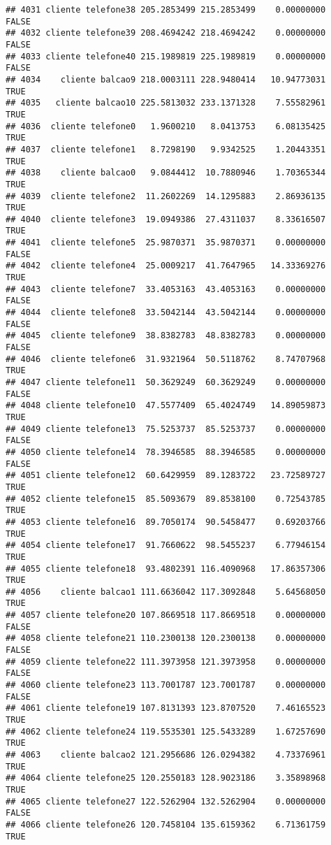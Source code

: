 \documentclass[
]{article}
\begin{document}
\begin{verbatim}
## 4031 cliente telefone38 205.2853499 215.2853499    0.00000000    FALSE
## 4032 cliente telefone39 208.4694242 218.4694242    0.00000000    FALSE
## 4033 cliente telefone40 215.1989819 225.1989819    0.00000000    FALSE
## 4034    cliente balcao9 218.0003111 228.9480414   10.94773031     TRUE
## 4035   cliente balcao10 225.5813032 233.1371328    7.55582961     TRUE
## 4036  cliente telefone0   1.9600210   8.0413753    6.08135425     TRUE
## 4037  cliente telefone1   8.7298190   9.9342525    1.20443351     TRUE
## 4038    cliente balcao0   9.0844412  10.7880946    1.70365344     TRUE
## 4039  cliente telefone2  11.2602269  14.1295883    2.86936135     TRUE
## 4040  cliente telefone3  19.0949386  27.4311037    8.33616507     TRUE
## 4041  cliente telefone5  25.9870371  35.9870371    0.00000000    FALSE
## 4042  cliente telefone4  25.0009217  41.7647965   14.33369276     TRUE
## 4043  cliente telefone7  33.4053163  43.4053163    0.00000000    FALSE
## 4044  cliente telefone8  33.5042144  43.5042144    0.00000000    FALSE
## 4045  cliente telefone9  38.8382783  48.8382783    0.00000000    FALSE
## 4046  cliente telefone6  31.9321964  50.5118762    8.74707968     TRUE
## 4047 cliente telefone11  50.3629249  60.3629249    0.00000000    FALSE
## 4048 cliente telefone10  47.5577409  65.4024749   14.89059873     TRUE
## 4049 cliente telefone13  75.5253737  85.5253737    0.00000000    FALSE
## 4050 cliente telefone14  78.3946585  88.3946585    0.00000000    FALSE
## 4051 cliente telefone12  60.6429959  89.1283722   23.72589727     TRUE
## 4052 cliente telefone15  85.5093679  89.8538100    0.72543785     TRUE
## 4053 cliente telefone16  89.7050174  90.5458477    0.69203766     TRUE
## 4054 cliente telefone17  91.7660622  98.5455237    6.77946154     TRUE
## 4055 cliente telefone18  93.4802391 116.4090968   17.86357306     TRUE
## 4056    cliente balcao1 111.6636042 117.3092848    5.64568050     TRUE
## 4057 cliente telefone20 107.8669518 117.8669518    0.00000000    FALSE
## 4058 cliente telefone21 110.2300138 120.2300138    0.00000000    FALSE
## 4059 cliente telefone22 111.3973958 121.3973958    0.00000000    FALSE
## 4060 cliente telefone23 113.7001787 123.7001787    0.00000000    FALSE
## 4061 cliente telefone19 107.8131393 123.8707520    7.46165523     TRUE
## 4062 cliente telefone24 119.5535301 125.5433289    1.67257690     TRUE
## 4063    cliente balcao2 121.2956686 126.0294382    4.73376961     TRUE
## 4064 cliente telefone25 120.2550183 128.9023186    3.35898968     TRUE
## 4065 cliente telefone27 122.5262904 132.5262904    0.00000000    FALSE
## 4066 cliente telefone26 120.7458104 135.6159362    6.71361759     TRUE

\end{verbatim}
\end{document}
